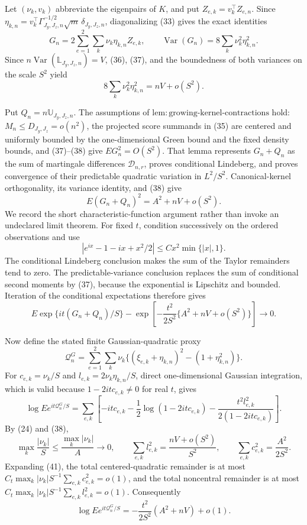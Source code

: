 Let \((\nu_k,v_k)\) abbreviate the eigenpairs of \(K\), and put \(Z_{e,k}=v_k^{\top}Z_{e,n}\).  Since
\(\eta_{k,n}=v_k^{\top}\Gamma_{J_y,J_z,n}^{-1/2}\sqrt m\,\delta_{J_y,J_z,n}\), diagonalizing (33) gives the exact identities
\[
G_n=2\sum_{e=1}^2\sum_k\nu_k\eta_{k,n}Z_{e,k},
\qquad
\operatorname{Var}(G_n)=8\sum_k\nu_k^2\eta_{k,n}^2.
\tag{37}
\]
Since \(n\operatorname{Var}(\mathbb L_{J_y,J_z,n})=V\), (36), (37), and the boundedness of both variances on the scale \(S^2\) yield
\[
8\sum_k\nu_k^2\eta_{k,n}^2=nV+o(S^2).
\tag{38}
\]

Put \(Q_n=n\mathbb U_{J_y,J_z,n}\).  The assumptions of \(\mathrm{lem{:}growing\text{-}kernel\text{-}contractions}\) hold: \(M_n\le D_{J_y,J_z}=o(n^2)\), the projected score summands in (35) are centered and uniformly bounded by the one-dimensional Green bound and the fixed density bounds, and (37)--(38) give \(EG_n^2=O(S^2)\).  That lemma represents \(G_n+Q_n\) as the sum of martingale differences \(\mathcal D_{n,r}\), proves conditional Lindeberg, and proves convergence of their predictable quadratic variation in \(L^2/S^2\).  Canonical-kernel orthogonality, its variance identity, and (38) give
\[
E(G_n+Q_n)^2=A^2+nV+o(S^2).
\tag{39}
\]
We record the short characteristic-function argument rather than invoke an undeclared limit theorem.  For fixed \(t\), condition successively on the ordered observations and use
\[
|e^{ix}-1-ix+x^2/2|\le Cx^2\min\{|x|,1\}.
\]
The conditional Lindeberg conclusion makes the sum of the Taylor remainders tend to zero.  The predictable-variance conclusion replaces the sum of conditional second moments by (37), because the exponential is Lipschitz and bounded.  Iteration of the conditional expectations therefore gives
\[
E\exp\{it(G_n+Q_n)/S\}
-\exp\!\left[-\frac{t^2}{2S^2}\{A^2+nV+o(S^2)\}\right]\longrightarrow0.
\tag{40}
\]

Now define the stated finite Gaussian-quadratic proxy
\[
\mathcal Q_n^G=\sum_{e=1}^2\sum_k\nu_k
\{(\xi_{e,k}+\eta_{k,n})^2-(1+\eta_{k,n}^2)\}.
\]
For \(c_{e,k}=\nu_k/S\) and \(l_{e,k}=2\nu_k\eta_{k,n}/S\), direct one-dimensional Gaussian integration, which is valid because \(1-2itc_{e,k}\ne0\) for real \(t\), gives
\[
\log E e^{it\mathcal Q_n^G/S}
=\sum_{e,k}\left[-itc_{e,k}-\frac12\log(1-2itc_{e,k})
-\frac{t^2l_{e,k}^2}{2(1-2itc_{e,k})}\right].
\tag{41}
\]
By (24) and (38),
\[
\max_k\frac{|\nu_k|}{S}\le\frac{\max_k|\nu_k|}{A}\to0,
\qquad
\sum_{e,k}l_{e,k}^2=\frac{nV+o(S^2)}{S^2},
\qquad
\sum_{e,k}c_{e,k}^2=\frac{A^2}{2S^2}.
\tag{42}
\]
Expanding (41), the total centered-quadratic remainder is at most
\(C_t\max_k|\nu_k|S^{-1}\sum_{e,k}c_{e,k}^2=o(1)\), and the total noncentral remainder is at most
\(C_t\max_k|\nu_k|S^{-1}\sum_{e,k}l_{e,k}^2=o(1)\).  Consequently
\[
\log E e^{it\mathcal Q_n^G/S}
=-\frac{t^2}{2S^2}(A^2+nV)+o(1).
\tag{43}
\]

